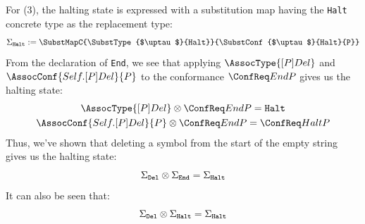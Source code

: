 \documentclass[../generics]{subfiles}
\begin{document}
For (3), the halting state is expressed with a substitution map having the \texttt{Halt} concrete type as the replacement type:
\[\SigmaHalt := \SubstMapC{\SubstType{$\uptau$}{Halt}}{\SubstConf{$\uptau$}{Halt}{P}}\]
From the declaration of \texttt{End}, we see that applying $\AssocType{[P]Del}$ and $\AssocConf{Self.[P]Del}{P}$ to the conformance $\ConfEndP$ gives us the halting state:
\begin{gather*}
\AssocType{[P]Del}\otimes\ConfEndP=\texttt{Halt}\\
\AssocConf{Self.[P]Del}{P}\otimes\ConfEndP=\ConfHaltP
\end{gather*}
Thus, we've shown that deleting a symbol from the start of the empty string gives us the halting state:
\[\Sigma_{\texttt{Del}}\otimes\Sigma_{\texttt{End}}=\Sigma_{\texttt{Halt}}\]
It can also be seen that:
\[\Sigma_{\texttt{Del}}\otimes\Sigma_{\texttt{Halt}}=\Sigma_{\texttt{Halt}}\]
\end{document}
